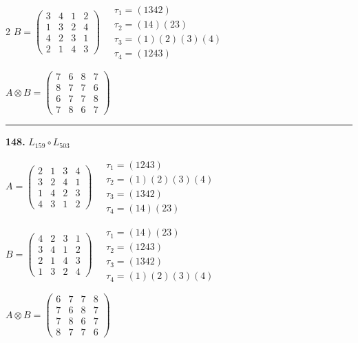 \begin{multicols}{2}
$B = \begin{pmatrix} 3 & 4 & 1 & 2 \\ 1 & 3 & 2 & 4 \\ 4 & 2 & 3 & 1 \\ 2 & 1 & 4 & 3 \end{pmatrix} \quad \begin{matrix} \tau_{1}=(1 3 4 2) \\ \tau_{2}=(1 4)(2 3) \\ \tau_{3}=(1)(2)(3)(4) \\ \tau_{4}=(1 2 4 3) \end{matrix}$

$A \otimes B = \begin{pmatrix} 7 & 6 & 8 & 7 \\ 8 & 7 & 7 & 6 \\ 6 & 7 & 7 & 8 \\ 7 & 8 & 6 & 7 \end{pmatrix}$

\vspace{0.3em}
\hrule
\vspace{0.3em}

\noindent\textbf{148.} $L_{159} \circ L_{503}$

$A = \begin{pmatrix} 2 & 1 & 3 & 4 \\ 3 & 2 & 4 & 1 \\ 1 & 4 & 2 & 3 \\ 4 & 3 & 1 & 2 \end{pmatrix} \quad \begin{matrix} \tau_{1}=(1 2 4 3) \\ \tau_{2}=(1)(2)(3)(4) \\ \tau_{3}=(1 3 4 2) \\ \tau_{4}=(1 4)(2 3) \end{matrix}$

$B = \begin{pmatrix} 4 & 2 & 3 & 1 \\ 3 & 4 & 1 & 2 \\ 2 & 1 & 4 & 3 \\ 1 & 3 & 2 & 4 \end{pmatrix} \quad \begin{matrix} \tau_{1}=(1 4)(2 3) \\ \tau_{2}=(1 2 4 3) \\ \tau_{3}=(1 3 4 2) \\ \tau_{4}=(1)(2)(3)(4) \end{matrix}$

$A \otimes B = \begin{pmatrix} 6 & 7 & 7 & 8 \\ 7 & 6 & 8 & 7 \\ 7 & 8 & 6 & 7 \\ 8 & 7 & 7 & 6 \end{pmatrix}$


\end{multicols}
